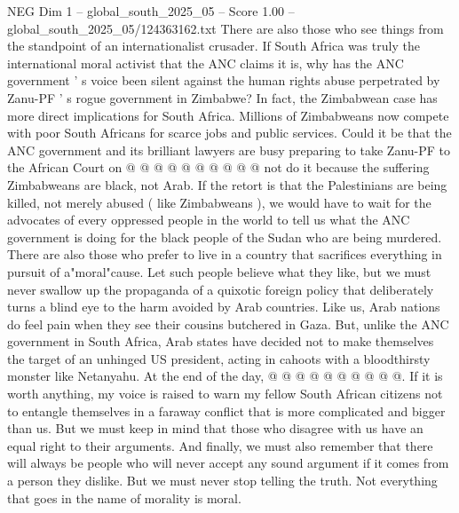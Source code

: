 \begin{textsample}{NEG Dim 1 – global\_south\_2025\_05 – Score 1.00 – global\_south\_2025\_05/124363162.txt}
There are also those who see things from the standpoint of an internationalist crusader.
If South Africa was truly the international moral activist that the ANC claims it is, why has the ANC government ' s voice been silent against the human rights abuse perpetrated by Zanu-PF ' s rogue government in Zimbabwe?
In fact, the Zimbabwean case has more direct implications for South Africa.
Millions of Zimbabweans now compete with poor South Africans for scarce jobs and public services.
Could it be that the ANC government and its brilliant lawyers are busy preparing to take Zanu-PF to the African Court on @ @ @ @ @ @ @ @ @ @ not do it because the suffering Zimbabweans are black, not Arab.
If the retort is that the Palestinians are being killed, not merely abused ( like Zimbabweans ), we would have to wait for the advocates of every oppressed people in the world to tell us what the ANC government is doing for the black people of the Sudan who are being murdered.
There are also those who prefer to live in a country that sacrifices everything in pursuit of a"moral"cause.
Let such people believe what they like, but we must never swallow up the propaganda of a quixotic foreign policy that deliberately turns a blind eye to the harm avoided by Arab countries.
Like us, Arab nations do feel pain when they see their cousins butchered in Gaza.
But, unlike the ANC government in South Africa, Arab states have decided not to make themselves the target of an unhinged US president, acting in cahoots with a bloodthirsty monster like Netanyahu.
At the end of the day, @ @ @ @ @ @ @ @ @ @.
If it is worth anything, my voice is raised to warn my fellow South African citizens not to entangle themselves in a faraway conflict that is more complicated and bigger than us.
But we must keep in mind that those who disagree with us have an equal right to their arguments.
And finally, we must also remember that there will always be people who will never accept any sound argument if it comes from a person they dislike.
But we must never stop telling the truth.
Not everything that goes in the name of morality is moral.

\end{textsample}
